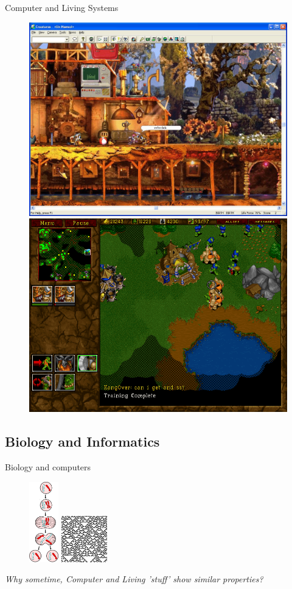 \documentclass[8pt, handout=show,notes=show]{beamer}
\begin{document}
\begin{frame}{Computer and Living Systems}
    \begin{figure}
	\includegraphics[width=.6\textwidth]{images/creatures.jpg}\\
	\includegraphics[width=.6\textwidth]{images/war2.png}
    \end{figure}


    
\end{frame}

\subsection{Biology and Informatics}
\begin{frame} {Biology and computers}

    \begin{figure}
	\includegraphics[height=3.5cm]{images/mitosis.png}\hspace{.8cm}
	\includegraphics[width=2cm]{images/Rule22rand.png} 
    \end{figure}

    \vfill

    \begin{center}
	\emph{Why sometime, Computer and Living 'stuff' show similar properties? }
    \end{center}

\end{frame}
\end{document}
